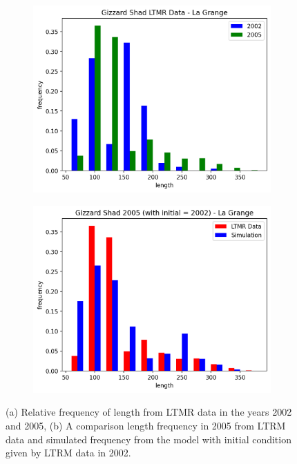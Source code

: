 \documentclass[11pt,oneside]{amsart}
\theoremstyle{definition}
\begin{document}
\begin{figure}
\centering
\begin{subfigure}[b]{.45\textwidth}
  \includegraphics[width=\textwidth]{figures/LGdata.png}
     \caption{}
  \label{fig:LGdata}
\end{subfigure}
\begin{subfigure}[b]{.45\textwidth}
   \includegraphics[width=\textwidth]{figures/LGdata_sim.png}
     \caption{}
\label{fig:LGdata_sim}
\end{subfigure}
\caption{(a) Relative frequency of length from LTMR data in the years 2002 and 2005, (b) A comparison length frequency in 2005 from LTRM data and simulated frequency from the model with initial condition given by LTRM data in 2002.}
\end{figure}    
\end{document}
